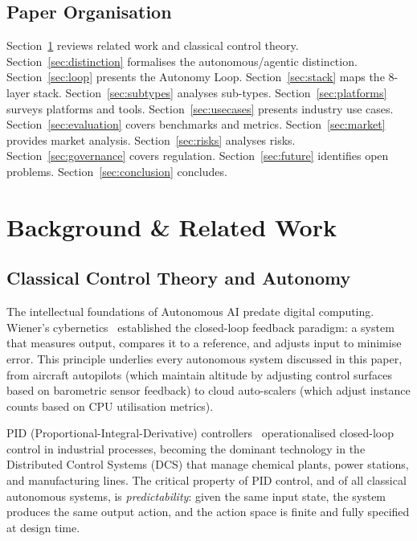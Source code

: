 \documentclass[12pt, a4paper]{article}
\begin{document}
\subsection{Paper Organisation}
Section~\ref{sec:background} reviews related work and classical control theory. Section~\ref{sec:distinction} formalises the autonomous/agentic distinction. Section~\ref{sec:loop} presents the Autonomy Loop. Section~\ref{sec:stack} maps the 8-layer stack. Section~\ref{sec:subtypes} analyses sub-types. Section~\ref{sec:platforms} surveys platforms and tools. Section~\ref{sec:usecases} presents industry use cases. Section~\ref{sec:evaluation} covers benchmarks and metrics. Section~\ref{sec:market} provides market analysis. Section~\ref{sec:risks} analyses risks. Section~\ref{sec:governance} covers regulation. Section~\ref{sec:future} identifies open problems. Section~\ref{sec:conclusion} concludes.

\section{Background \& Related Work}\label{sec:background}

\subsection{Classical Control Theory and Autonomy}
The intellectual foundations of Autonomous AI predate digital computing. Wiener's cybernetics~\citep{wiener1948cybernetics} established the closed-loop feedback paradigm: a system that measures output, compares it to a reference, and adjusts input to minimise error. This principle underlies every autonomous system discussed in this paper, from aircraft autopilots (which maintain altitude by adjusting control surfaces based on barometric sensor feedback) to cloud auto-scalers (which adjust instance counts based on CPU utilisation metrics).

PID (Proportional-Integral-Derivative) controllers~\citep{astrom2006pid} operationalised closed-loop control in industrial processes, becoming the dominant technology in the Distributed Control Systems (DCS) that manage chemical plants, power stations, and manufacturing lines. The critical property of PID control, and of all classical autonomous systems, is \emph{predictability}: given the same input state, the system produces the same output action, and the action space is finite and fully specified at design time.
\end{document}
